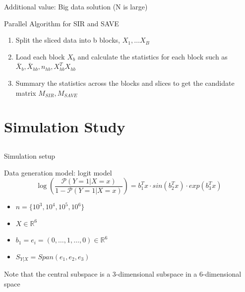 \documentclass[ignorenonframetext,]{beamer}
\providecommand{\tightlist}{%
  \setlength{\itemsep}{0pt}\setlength{\parskip}{0pt}}
\begin{document}
\begin{frame}{Additional value: Big data solution (N is large)}

\begin{block}{Parallel Algorithm for SIR and SAVE}

\begin{enumerate}
\def\labelenumi{\arabic{enumi}.}
\tightlist
\item
  Split the sliced data into b blocks, \(X_1, \dots X_B\)\\
\item
  Load each block \(X_b\) and calculate the statistics for each block
  such as \(\bar{X}_b, \bar{X}_{hb}, n_{hb}, X^T_{hb}X_{hb}\)\\
\item
  Summary the statistics across the blocks and slices to get the
  candidate matrix \(M_{SIR}, M_{SAVE}\)
\end{enumerate}

\end{block}

\end{frame}

\section{Simulation Study}\label{simulation-study}

\subsection{}\label{section}

\begin{frame}{Simulation setup}

\begin{block}{Data generation model: logit model}
\[
    \log\left(\frac{\mathcal{P}(Y=1|X=x)}{1-\mathcal{P}(Y=1|X=x)}\right) = b_1^Tx \cdot sin(b_2^Tx) \cdot exp(b_3^Tx)
\]
\begin{itemize}
\item $n = \{10^3, 10^4, 10^5,10^6\}$    
\item $X \in \mathbb{R}^6$   
\item $b_1 = e_i = (0, \dots, 1, \dots,0) \in \mathbb{R}^6$  
\item $S_{Y|X} = Span(e_1, e_2, e_3)$   
\end{itemize}
\end{block}

Note that the central subspace is a 3-dimensional subspace in a
6-dimensional space

\end{frame}
\end{document}
